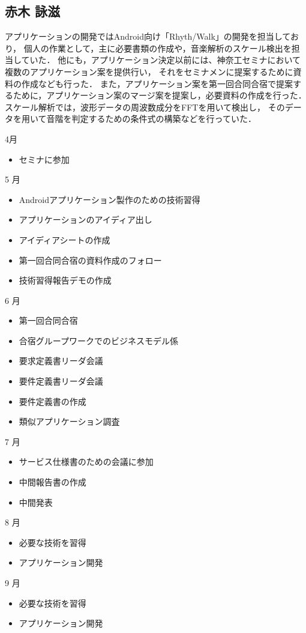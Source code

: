 \subsection{赤木 詠滋}
アプリケーションの開発ではAndroid向け「Rhyth/Walk」の開発を担当しており，
個人の作業として，主に必要書類の作成や，音楽解析のスケール検出を担当していた．
他にも，アプリケーション決定以前には、神奈工セミナにおいて複数のアプリケーション案を提供行い，
それをセミナメンに提案するために資料の作成なども行った．
また，アプリケーション案を第一回合同合宿で提案するために，アプリケーション案のマージ案を提案し，必要資料の作成を行った．
スケール解析では，波形データの周波数成分をFFTを用いて検出し，
そのデータを用いて音階を判定するための条件式の構築などを行っていた．\par
4月
\begin{itemize}
\item セミナに参加
\end{itemize}
5 月
\begin{itemize}
\item Androidアプリケーション製作のための技術習得
\item アプリケーションのアイディア出し
\item アイディアシートの作成
\item 第一回合同合宿の資料作成のフォロー
\item 技術習得報告デモの作成
\end{itemize}
6 月
\begin{itemize}
\item 第一回合同合宿
\item 合宿グループワークでのビジネスモデル係
\item 要求定義書リーダ会議
\item 要件定義書リーダ会議
\item 要件定義書の作成
\item 類似アプリケーション調査
\end{itemize}
7 月
\begin{itemize}
\item サービス仕様書のための会議に参加
\item 中間報告書の作成
\item 中間発表
\end{itemize}
8 月
\begin{itemize}
\item 必要な技術を習得
\item アプリケーション開発
\end{itemize}
9 月
\begin{itemize}
\item 必要な技術を習得
\item アプリケーション開発
\end{itemize}
